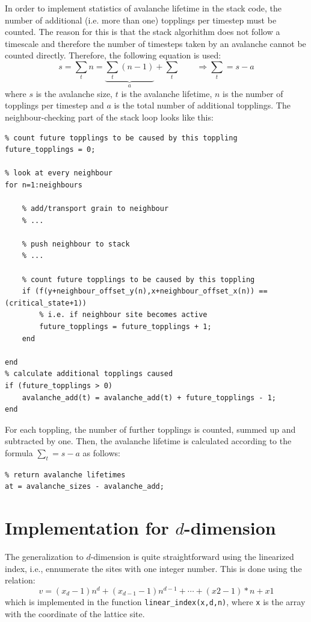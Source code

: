 In order to implement statistics of avalanche lifetime in the stack code, the number of additional (i.e. more than one) topplings per timestep must be counted. The reason for this is that the stack algorhithm does not follow a timescale and therefore the number of timesteps taken by an avalanche cannot be counted directly. Therefore, the following equation is used:
\[
s = \sum _t n = \underbrace{\sum_t (n - 1)}_{a} + \sum _t
\qquad \Rightarrow \sum _t = s - a
\]
where $s$ is the avalanche size, $t$ is the avalanche lifetime, $n$ is the number of topplings per timestep and $a$ is the total number of additional topplings. The neighbour-checking part of the stack loop looks like this:
\begin{lstlisting}
% count future topplings to be caused by this toppling
future_topplings = 0;

% look at every neighbour
for n=1:neighbours

	% add/transport grain to neighbour
	% ...

	% push neighbour to stack
	% ...

	% count future topplings to be caused by this toppling
	if (f(y+neighbour_offset_y(n),x+neighbour_offset_x(n)) == (critical_state+1))
		% i.e. if neighbour site becomes active
		future_topplings = future_topplings + 1;
	end

end
% calculate additional topplings caused
if (future_topplings > 0)
	avalanche_add(t) = avalanche_add(t) + future_topplings - 1;
end
\end{lstlisting}
For each toppling, the number of further topplings is counted, summed up and subtracted by one. Then, the avalanche lifetime is calculated according to the formula $\sum _t = s - a$ as follows:
\begin{lstlisting}
% return avalanche lifetimes
at = avalanche_sizes - avalanche_add;
\end{lstlisting}

\section{Implementation for $d$-dimension}

The generalization to $d$-dimension is quite straightforward using the linearized index, i.e., ennumerate the sites with one integer number. 
This is done using the relation:
\[
 v=(x_d-1)n^d+(x_{d-1}-1)n^{d-1}+\cdots+(x2-1)*n+x1
\]
which is implemented in the function \texttt{linear_index(x,d,n)}, where \texttt{x} is the array with the coordinate of the lattice site. 



